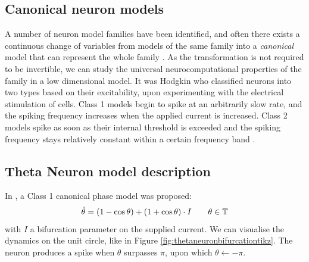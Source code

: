\subsection{Canonical neuron models}
A number of neuron model families have been identified, and often there exists a continuous change of variables from models of the same family into a \textit{canonical} model that can represent the whole family \cite{Hoppensteadt2001CanonicalNM}. As the transformation is not required to be invertible, we can study the universal neurocomputational properties of the family in a low dimensional model.
It was Hodgkin \cite{Hodgkin1948} who classified neurons into two types based on their excitability, upon experimenting with the electrical stimulation of cells. Class 1 models begin to spike at an arbitrarily slow rate, and the spiking frequency increases when the applied current is increased. Class 2 models spike as soon as their internal threshold is exceeded and the spiking frequency stays relatively constant within a certain frequency band \cite{Hoppensteadt2001CanonicalNM}.


\subsection{Theta Neuron model description} \label{sec:TheThetaNeuronModelDescription}
In \cite{Ermentrout1986}, a Class 1 canonical phase model was proposed:
\begin{align}
\dot{\theta} = (1-\cos \theta)+(1+\cos \theta) \cdot I \qquad \theta \in {\mathbb{T}} \label{eq:thetaneuron}
\end{align}
with $I$ a bifurcation parameter on the supplied current. We can visualise the dynamics on the unit circle, like in Figure \ref{fig:thetaneuronbifurcationtikz}. The neuron produces a spike when $\theta$ surpasses $\pi$, upon which $\theta \leftarrow -\pi$. 

